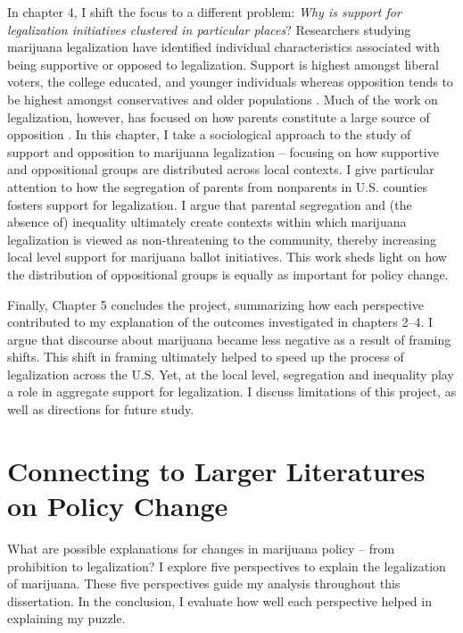 In chapter 4, I shift the focus to a different problem: \textit{Why is support for legalization initiatives clustered in particular places}? Researchers studying marijuana legalization have identified individual characteristics associated with being supportive or opposed to legalization. Support is highest amongst liberal voters, the college educated, and younger individuals whereas opposition tends to be highest amongst conservatives and older populations \citep{caulkins_et_al_2012,schnabel_and_sevell_2017}. Much of the work on legalization, however, has focused on how parents constitute a large source of opposition \citep{newhart_and_dolphin_2018, rosenthal_and_kubby_1996,miron_2010,caulkins_et_al_2012}. In this chapter, I take a sociological approach to the study of support and opposition to marijuana legalization -- focusing on how supportive and oppositional groups are distributed across local contexts. I give particular attention to how the segregation of parents from nonparents in U.S. counties fosters support for legalization. I argue that parental segregation and (the absence of) inequality ultimately create contexts within which marijuana legalization is viewed as non-threatening to the community, thereby increasing local level support for marijuana ballot initiatives. This work sheds light on how the distribution of oppositional groups is equally as important for policy change.

Finally, Chapter 5 concludes the project, summarizing how each perspective contributed to my explanation of the outcomes investigated in chapters 2--4. I argue that discourse about marijuana became less negative as a result of framing shifts. This shift in framing ultimately helped to speed up the process of legalization across the U.S. Yet, at the local level, segregation and inequality play a role in aggregate support for legalization. I discuss limitations of this project, as well as directions for future study.



\section{Connecting to Larger Literatures on Policy Change}

What are possible explanations for changes in marijuana policy -- from prohibition to legalization? I explore five perspectives to explain the legalization of marijuana. These five perspectives guide my analysis throughout this dissertation. In the conclusion, I evaluate how well each perspective helped in explaining my puzzle.


